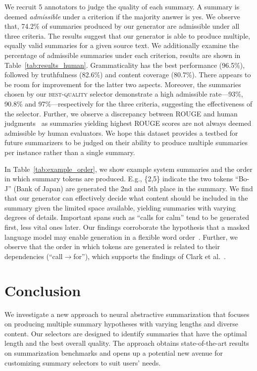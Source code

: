 \documentclass[11pt]{article}
\begin{document}
We recruit 5 annotators to judge the quality of each summary.
A summary is deemed \emph{admissible} under a criterion if the majority answer is yes.
We observe that, 74.2\% of summaries produced by our generator are admissible under all three criteria. The results suggest that our generator is able to produce multiple, equally valid summaries for a given source text.
We additionally examine the percentage of admissible summaries under each criterion, results are shown in Table~\ref{tab:results_human}.
Grammaticality has the best performance (96.5\%), followed by truthfulness (82.6\%) and content coverage (80.7\%). There appears to be room for improvement for the latter two aspects.
Moreover, the summaries chosen by our \textsc{best-quality} selector demonstrate a high admissible rate—93\%, 90.8\% and 97\%—respectively for the three criteria, suggesting the effectiveness of the selector.
Further, we observe a discrepancy between ROUGE and human judgments~\cite{fabbri2020summeval} as summaries yielding highest ROUGE scores are not always deemed admissible by human evaluators.
We hope this dataset provides a testbed for future summarizers to be judged on their ability to produce multiple summaries per instance rather than a single summary.


In Table~\ref{tab:example_order}, we show example system summaries and the order in which summary tokens are produced.
E.g., \{2,5\} indicate the two tokens ``Bo-J'' (Bank of Japan) are generated the 2nd and 5th place in the summary.
We find that our generator can effectively decide what content should be included in the summary given the limited space available, yielding summaries with varying degrees of details.
Important spans such as ``calls for calm'' tend to be generated first, less vital ones later. 
Our findings corroborate the hypothesis that a masked language model may enable generation in a flexible word order~\cite{liao-etal-2020-probabilistically}.
Further, we observe that the order in which tokens are generated is related to their dependencies (``call$\rightarrow$for''), which supports the findings of Clark et al.~.


\section{Conclusion}
\label{sec:conclusion}

We investigate a new approach to neural abstractive summarization that focuses on producing multiple summary hypotheses with varying lengths and diverse content.
Our selectors are designed to identify summaries that have the optimal length and the best overall quality.
The approach obtains state-of-the-art results on summarization benchmarks and opens up a potential new avenue for customizing summary selectors to suit users' needs.
\end{document}
